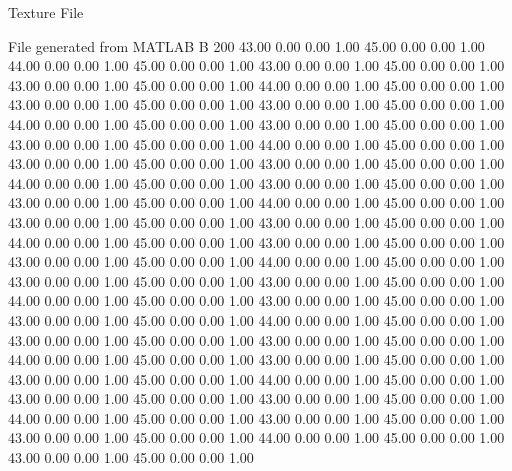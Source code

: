 Texture File

File generated from MATLAB
B 200
   43.00   0.00   0.00   1.00
   45.00   0.00   0.00   1.00
   44.00   0.00   0.00   1.00
   45.00   0.00   0.00   1.00
   43.00   0.00   0.00   1.00
   45.00   0.00   0.00   1.00
   43.00   0.00   0.00   1.00
   45.00   0.00   0.00   1.00
   44.00   0.00   0.00   1.00
   45.00   0.00   0.00   1.00
   43.00   0.00   0.00   1.00
   45.00   0.00   0.00   1.00
   43.00   0.00   0.00   1.00
   45.00   0.00   0.00   1.00
   44.00   0.00   0.00   1.00
   45.00   0.00   0.00   1.00
   43.00   0.00   0.00   1.00
   45.00   0.00   0.00   1.00
   43.00   0.00   0.00   1.00
   45.00   0.00   0.00   1.00
   44.00   0.00   0.00   1.00
   45.00   0.00   0.00   1.00
   43.00   0.00   0.00   1.00
   45.00   0.00   0.00   1.00
   43.00   0.00   0.00   1.00
   45.00   0.00   0.00   1.00
   44.00   0.00   0.00   1.00
   45.00   0.00   0.00   1.00
   43.00   0.00   0.00   1.00
   45.00   0.00   0.00   1.00
   43.00   0.00   0.00   1.00
   45.00   0.00   0.00   1.00
   44.00   0.00   0.00   1.00
   45.00   0.00   0.00   1.00
   43.00   0.00   0.00   1.00
   45.00   0.00   0.00   1.00
   43.00   0.00   0.00   1.00
   45.00   0.00   0.00   1.00
   44.00   0.00   0.00   1.00
   45.00   0.00   0.00   1.00
   43.00   0.00   0.00   1.00
   45.00   0.00   0.00   1.00
   43.00   0.00   0.00   1.00
   45.00   0.00   0.00   1.00
   44.00   0.00   0.00   1.00
   45.00   0.00   0.00   1.00
   43.00   0.00   0.00   1.00
   45.00   0.00   0.00   1.00
   43.00   0.00   0.00   1.00
   45.00   0.00   0.00   1.00
   44.00   0.00   0.00   1.00
   45.00   0.00   0.00   1.00
   43.00   0.00   0.00   1.00
   45.00   0.00   0.00   1.00
   43.00   0.00   0.00   1.00
   45.00   0.00   0.00   1.00
   44.00   0.00   0.00   1.00
   45.00   0.00   0.00   1.00
   43.00   0.00   0.00   1.00
   45.00   0.00   0.00   1.00
   43.00   0.00   0.00   1.00
   45.00   0.00   0.00   1.00
   44.00   0.00   0.00   1.00
   45.00   0.00   0.00   1.00
   43.00   0.00   0.00   1.00
   45.00   0.00   0.00   1.00
   43.00   0.00   0.00   1.00
   45.00   0.00   0.00   1.00
   44.00   0.00   0.00   1.00
   45.00   0.00   0.00   1.00
   43.00   0.00   0.00   1.00
   45.00   0.00   0.00   1.00
   43.00   0.00   0.00   1.00
   45.00   0.00   0.00   1.00
   44.00   0.00   0.00   1.00
   45.00   0.00   0.00   1.00
   43.00   0.00   0.00   1.00
   45.00   0.00   0.00   1.00
   43.00   0.00   0.00   1.00
   45.00   0.00   0.00   1.00
   44.00   0.00   0.00   1.00
   45.00   0.00   0.00   1.00
   43.00   0.00   0.00   1.00
   45.00   0.00   0.00   1.00
